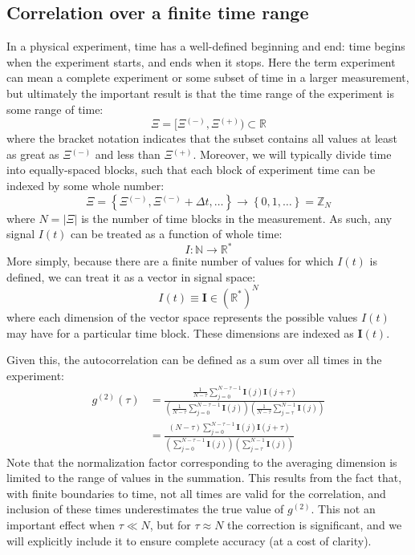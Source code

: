 \documentclass{article}
\newcommand{\braces}[1]{\ensuremath{\left\lbrace #1 \right\rbrace}}
\newcommand{\parens}[1]{\ensuremath{\left( #1 \right)}}
\newcommand{\gn}[1]{\ensuremath{g^{(#1)}}}
\newcommand{\integers}{\ensuremath{\mathbb{Z}}}
\newcommand{\wholes}{\ensuremath{\mathbb{N}}}
\newcommand{\reals}{\ensuremath{\mathbb{R}}}
\renewcommand{\vec}{\boldsymbol}
\newcommand{\abs}[1]{\ensuremath{\left|#1\right|}}
\newcommand{\integrationtime}{\ensuremath{\Xi}}
\newcommand{\tstart}{\integrationtime\upminus}
\newcommand{\tstop}{\integrationtime\upplus}
\newcommand{\upplus}{\ensuremath{^{(+)}}}
\newcommand{\upminus}{\ensuremath{^{(-)}}}
\begin{document}
\subsection{Correlation over a finite time range}
In a physical experiment, time has a well-defined beginning and end: time begins when the experiment starts, and ends when it stops. Here the term experiment can mean a complete experiment or some subset of time in a larger measurement, but ultimately the important result is that the time range of the experiment is some range of time:
\begin{equation}
\integrationtime = [\tstart,\tstop)\subset\reals
\end{equation}
where the bracket notation indicates that the subset contains all values at least as great as $\tstart$ and less than $\tstop$. Moreover, we will typically divide time into equally-spaced blocks, such that each block of experiment time can be indexed by some whole number:
\begin{equation}
\integrationtime = \braces{\tstart,\tstart+\Delta t,\ldots} 
       \rightarrow \braces{0,1,\ldots} = \integers_{N}
\end{equation}
where $N=\abs{\integrationtime}$ is the number of time blocks in the measurement. As such, any signal $I(t)$ can be treated as a function of whole time:
\begin{equation}
I:\wholes\rightarrow\reals^{*}
\end{equation}
More simply, because there are a finite number of values for which $I(t)$ is defined, we can treat it as a vector in signal space:
\begin{equation}
I(t) \equiv \vec{I}\in \left(\reals^{*}\right)^{N}
\end{equation}
where each dimension of the vector space represents the possible values $I(t)$ may have for a particular time block. These dimensions are indexed as $\vec{I}(t)$.

Given this, the autocorrelation can be defined as a sum over all times in the experiment:
\begin{align}
\gn{2}(\tau) &= \frac{\frac{1}{N-\tau}\sum_{j=0}^{N-\tau-1}{\vec{I}(j)\vec{I}(j+\tau)}}
                     {\parens{\frac{1}{N-\tau}\sum_{j=0}^{N-\tau-1}{\vec{I}(j)}}
                      \parens{\frac{1}{N-\tau}\sum_{j=\tau}^{N-1}{\vec{I}(j)}}} \nonumber \\
\label{eq:discrete_g2} &= \frac{\parens{N-\tau}\sum_{j=0}^{N-\tau-1}{\vec{I}(j)\vec{I}(j+\tau)}}
                    {\parens{\sum_{j=0}^{N-\tau-1}{\vec{I}(j)}}
                     \parens{\sum_{j=\tau}^{N-1}{\vec{I}(j)}}}
\end{align}
Note that the normalization factor corresponding to the averaging dimension is limited to the range of values in the summation. This results from the fact that, with finite boundaries to time, not all times are valid for the correlation, and inclusion of these times underestimates the true value of \gn{2}. This not an important effect when $\tau\ll N$, but for $\tau\approx N$ the correction is significant, and we will explicitly include it to ensure complete accuracy (at a cost of clarity).
\end{document}
